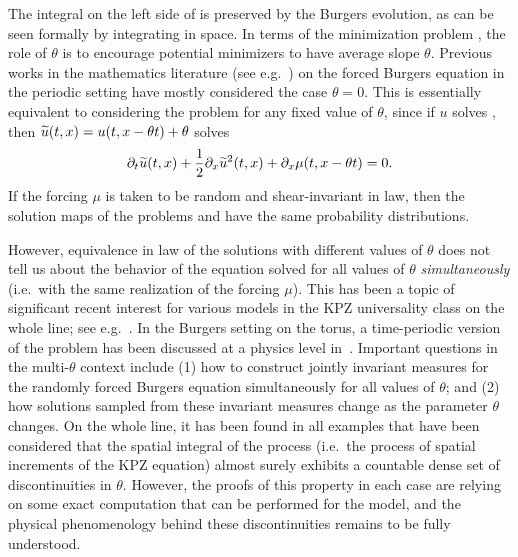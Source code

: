 \documentclass[AHL,Unicode,longabstracts]{cedram}
\newcounter{setofcase}
\newcounter{case}[setofcase]
\let\oldtilde\tilde
\renewcommand*{\tilde}[1]{\mathchoice{\widetilde{#1}}{\widetilde{#1}}{\oldtilde{#1}}{\oldtilde{#1}}}
\begin{document}
The integral on the left side of  is preserved by the Burgers evolution, as can be seen formally by integrating  in space. In terms of the minimization problem , the role of $\theta$ is to encourage potential minimizers to have average slope $\theta$. Previous works in the mathematics literature (see e.g.~\cite{Bak13,EKMS00,GIKP05,IK03}) on the forced Burgers equation in the periodic setting have mostly considered the case $\theta=0$. This is essentially equivalent to considering the problem for any fixed value of $\theta$, since if $u$ solves , then $\tilde{u}(t,x)=u(t,x-\theta t)+\theta$ solves
\begin{equation}\label{eq:veqn}
\partial_{t}\tilde{u}(t,x)+\frac{1}{2}\partial_{x}\tilde{u}^{2}(t,x)+\partial_{x}\mu(t,x-\theta t)=0.
\end{equation}
If the forcing $\mu$ is taken to be random and shear-invariant in law, then the solution maps of the problems  and  have the same probability distributions.

However, equivalence in law of the solutions with different values of $\theta$ does not tell us about the behavior of the equation solved for all values of $\theta$ \emph{simultaneously} (i.e.~with the same realization of the forcing $\mu$). This has been a topic of significant recent interest for various models in the KPZ universality class on the whole line; see e.g.~\cite{BFS23,BSS23,BSS24,FS20,GRASS23}. In the Burgers setting on the torus, a time-periodic version of the problem has been discussed at a physics level in~\cite{BK07}. Important questions in the multi-$\theta$ context include (1) how to construct jointly invariant measures for the randomly forced Burgers equation simultaneously for all values of $\theta$; and (2) how solutions sampled from these invariant measures change as the parameter $\theta$ changes. On the whole line, it has been found in all examples that have been considered that the spatial integral of the process (i.e.~the process of spatial increments of the KPZ equation) almost surely exhibits a countable dense set of discontinuities in $\theta$. However, the proofs of this property in each case are relying on some exact computation that can be performed for the model, and the physical phenomenology behind these discontinuities remains to be fully understood.
\end{document}
